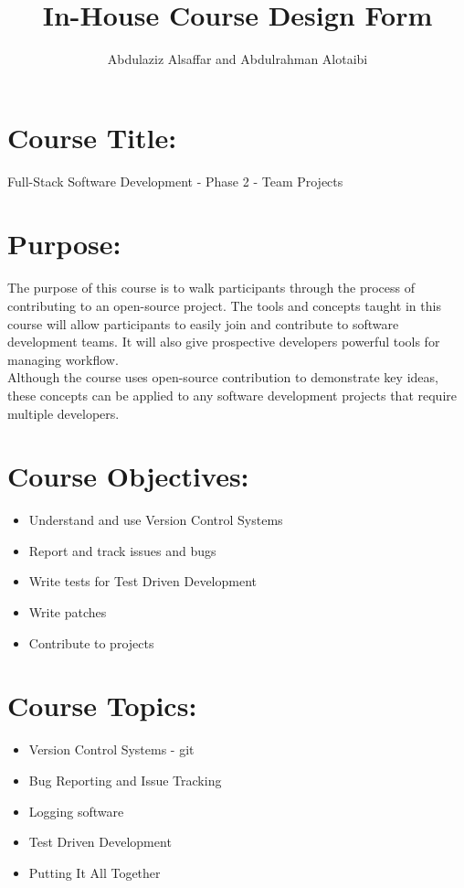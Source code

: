 \documentclass[a4paper,11pt]{article}
\author{Abdulaziz Alsa{f}far and Abdulrahman Alotaibi}
\title{In-House Course Design Form}
\begin{document}
\maketitle
\pagestyle{plain}
\setcounter{page}{1}

\section{Course Title:}
Full-Stack Software Development - Phase 2 - Team Projects

\section{Purpose:}
The purpose of this course is to walk participants through the process of contributing to an open-source project.
The tools and concepts taught in this course will allow participants to easily join and contribute to software development teams. It will also give prospective developers powerful tools for managing workflow.\\
Although the course uses open-source contribution to demonstrate key ideas, these concepts can be applied to any software development projects that require multiple developers.

\section{Course Objectives:}
\begin{itemize}
	\item Understand and use Version Control Systems
	\item Report and track issues and bugs
	\item Write tests for Test Driven Development
	\item Write patches
	\item Contribute to projects
\end{itemize}

\section{Course Topics:}
\begin{itemize}
	\item Version Control Systems - git
	\item Bug Reporting and Issue Tracking
	\item Logging software
	\item Test Driven Development
	\item Putting It All Together
\end{itemize}
\end{document}
